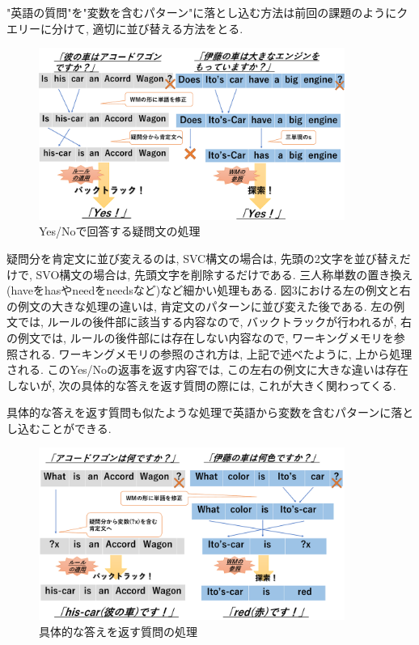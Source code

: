 \documentclass[uplatex,12pt]{jsarticle}
\begin{document}
"英語の質問"を"変数を含むパターン"に落とし込む方法は前回の課題のようにクエリーに分けて, 適切に並び替える方法をとる.

\begin{figure}[htbp]
 \begin{center}
  \includegraphics[width = 10cm, pagebox = cropbox, clip]{images/英文構造_YesNo型.pdf}
 \end{center}
 \caption[]{Yes/Noで回答する疑問文の処理}\label{fig:fig1.1}
\end{figure}

疑問分を肯定文に並び変えるのは, SVC構文の場合は, 先頭の2文字を並び替えだけで, SVO構文の場合は, 先頭文字を削除するだけである. 三人称単数の置き換え(haveをhasやneedをneedsなど)など細かい処理もある. 図3における左の例文と右の例文の大きな処理の違いは, 肯定文のパターンに並び変えた後である. 左の例文では, ルールの後件部に該当する内容なので, バックトラックが行われるが, 右の例文では, ルールの後件部には存在しない内容なので, ワーキングメモリを参照される. ワーキングメモリの参照のされ方は, 上記で述べたように, 上から処理される. このYes/Noの返事を返す内容では, この左右の例文に大きな違いは存在しないが, 次の具体的な答えを返す質問の際には, これが大きく関わってくる.


具体的な答えを返す質問も似たような処理で英語から変数を含むパターンに落とし込むことができる. 
\begin{figure}[htbp]
 \begin{center}
  \includegraphics[width = 10cm, pagebox = cropbox, clip]{images/英文構造_疑問詞SVO.pdf}
 \end{center}
 \caption[]{具体的な答えを返す質問の処理}\label{fig:fig1.1}
\end{figure}
\end{document}
